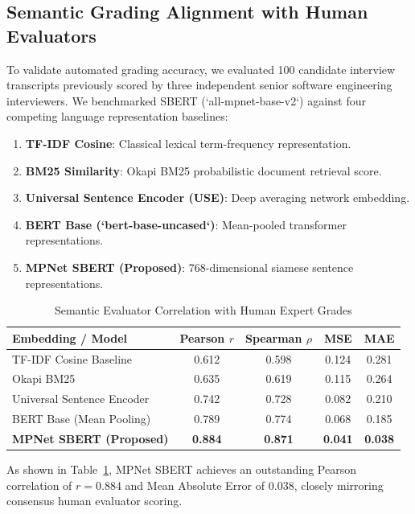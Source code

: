 \documentclass[conference]{IEEEtran}
\begin{document}
\subsection{Semantic Grading Alignment with Human Evaluators}
To validate automated grading accuracy, we evaluated 100 candidate interview transcripts previously scored by three independent senior software engineering interviewers. We benchmarked SBERT (`all-mpnet-base-v2`) against four competing language representation baselines:
\begin{enumerate}
    \item \textbf{TF-IDF Cosine}: Classical lexical term-frequency representation.
    \item \textbf{BM25 Similarity}: Okapi BM25 probabilistic document retrieval score.
    \item \textbf{Universal Sentence Encoder (USE)}: Deep averaging network embedding.
    \item \textbf{BERT Base (`bert-base-uncased`)}: Mean-pooled transformer representations.
    \item \textbf{MPNet SBERT (Proposed)}: 768-dimensional siamese sentence representations.
\end{enumerate}

\begin{table}[h]
\centering
\caption{Semantic Evaluator Correlation with Human Expert Grades}
\label{tab:c2_eval_corr}
\begin{tabular}{@{}lcccc@{}}
\toprule
\textbf{Embedding / Model} & \textbf{Pearson $r$} & \textbf{Spearman $\rho$} & \textbf{MSE} & \textbf{MAE} \\
\midrule
TF-IDF Cosine Baseline & 0.612 & 0.598 & 0.124 & 0.281 \\
Okapi BM25 & 0.635 & 0.619 & 0.115 & 0.264 \\
Universal Sentence Encoder & 0.742 & 0.728 & 0.082 & 0.210 \\
BERT Base (Mean Pooling) & 0.789 & 0.774 & 0.068 & 0.185 \\
\textbf{MPNet SBERT (Proposed)} & \textbf{0.884} & \textbf{0.871} & \textbf{0.041} & \textbf{0.038} \\
\bottomrule
\end{tabular}
\end{table}

As shown in Table~\ref{tab:c2_eval_corr}, MPNet SBERT achieves an outstanding Pearson correlation of $r = 0.884$ and Mean Absolute Error of $0.038$, closely mirroring consensus human evaluator scoring.
\end{document}
